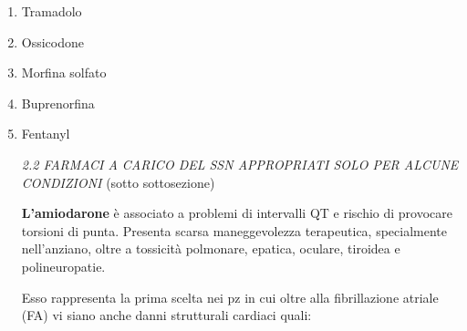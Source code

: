 \documentclass[]{article}
\begin{document}
\begin{enumerate}
\def\labelenumi{\arabic{enumi}.}
\item
  Tramadolo
\item
  Ossicodone
\item
  Morfina solfato
\item
  Buprenorfina
\item
  Fentanyl

  \emph{2.2 FARMACI A CARICO DEL SSN APPROPRIATI SOLO PER ALCUNE
  CONDIZIONI} (sotto sottosezione)

  \textbf{L'amiodarone} è associato a problemi di intervalli QT e
  rischio di provocare torsioni di punta. Presenta scarsa maneggevolezza
  terapeutica, specialmente nell'anziano, oltre a tossicità polmonare,
  epatica, oculare, tiroidea e polineuropatie.

  Esso rappresenta la prima scelta nei pz in cui oltre alla
  fibrillazione atriale (FA) vi siano anche danni strutturali cardiaci
  quali:
\end{enumerate}
\end{document}
